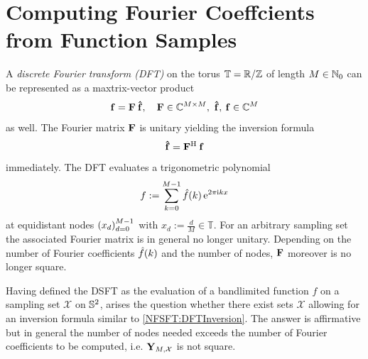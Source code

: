 \section{Computing Fourier Coeffcients from Function Samples}
A \emph{discrete Fourier transform (DFT)} on the torus $\mathbb{T} = \mathbb{R}/\mathbb{Z}$ of length $M \in \mathbb{N}_{0}$ can be represented 
as a maxtrix-vector product
$$
  \mathbf{f} = \mathbf{F} \: \mathbf{\hat{f}}, \quad \mathbf{F} \in \mathbb{C}^{M \times M},\ \mathbf{\hat{f}},\:\mathbf{f} \in \mathbb{C}^{M}
$$
as well. The Fourier matrix $\mathbf{F}$ is unitary yielding the inversion formula
\begin{equation}
  \label{NFSFT:DFTInversion}
  \mathbf{\hat{f}} = \mathbf{F}^{\text{\rm{H}}} \: \mathbf{f}
\end{equation}
immediately. The DFT evaluates a trigonometric polynomial 
$$
  f := \sum_{k=0}^{M-1} \hat{f}{\hspace{-0.4ex}}\left(k\right) \mbox{\rm{e}}^{2 \pi \mbox{\scriptsize\rm{i}} k x}
$$
at equidistant nodes $\left(x_{d}\right)_{d=0}^{M-1}$ with $x_{d} := \frac{d}{M} \in \mathbb{T}$. 
For an arbitrary sampling set  the associated Fourier matrix is in general no longer unitary. 
Depending on the number of Fourier coefficients $\hat{f}{\hspace{-0.4ex}}\left(k\right)$ and the number of nodes,
$\mathbf{F}$ moreover is no longer square.

Having defined the DSFT as the evaluation of a bandlimited function $f$ on a sampling set $\mathcal{X}$ on $\mathbb{S}^2$, arises the question 
whether there exist sets $\mathcal{X}$ allowing for an inversion formula similar to \eqref{NFSFT:DFTInversion}.
The answer is affirmative but in general the number of nodes needed exceeds the number of Fourier coefficients to be computed, 
i.e. $\mathbf{Y}_{M,\mathcal{X}}$ is not square.

